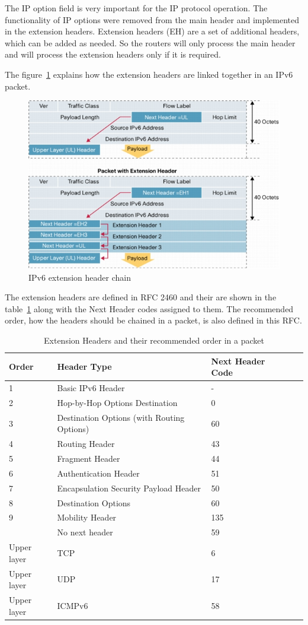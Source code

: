 \documentclass[a4paper]{report}
\begin{document}
The IP option field is very important for the IP protocol operation. The functionality of IP options were removed from the main header and implemented in the extension headers. Extension headers (EH) are a set of additional headers, which can be added as needed. So the routers will only process the main header and will process the extension headers only if it is required.

The figure~\ref{fig:IPv4_IPv6_ext_Header} explains how the extension headers are linked together in an IPv6 packet.
\begin{figure}
	\centering
	\includegraphics[width=0.8\linewidth]{ipv6_ipv4_ext_headers}%
	\caption {IPv6 extension header chain \parencite{cisco2006}}
	\label{fig:IPv4_IPv6_ext_Header}
\end{figure}
The extension headers are defined in RFC 2460 and their are shown in the table~\ref{tab:extension_header_codes} along with the Next Header codes assigned to them. The recommended order, how the headers should be chained in a packet, is also defined in this RFC. \parencite[1-3]{cisco2006}
\begin{table}[]
	\centering
	\caption{Extension Headers and their recommended order in a packet}
	\label{tab:extension_header_codes}
	\begin{tabular}{lllll}
		\hline
		\textbf{Order}&  \textbf{Header Type}&  \textbf{Next Header Code}\\
		\hline
		1&  Basic IPv6 Header&  - \\
		2&  Hop-by-Hop Options
		Destination&  0 \\
		3&  Destination Options (with Routing Options)&  60 \\
		4&  Routing Header&  43 \\
		5&  Fragment Header&  44 \\
		6&  Authentication Header&  51 \\
		7&  Encapsulation Security Payload Header&  50 \\
		8&  Destination Options&  60 \\
		9&  Mobility Header&  135 \\
		&  No next header&  59 \\
		Upper layer&  TCP&  6 \\
		Upper layer&  UDP&  17 \\
		Upper layer&  ICMPv6&  58 \\
	\end{tabular}
\end{table}
\end{document}
